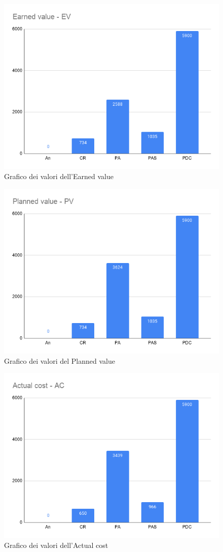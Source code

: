         \begin{figure}[H]
            \centering
            \includegraphics[width=11 cm]{source/sections/images/Earned_value.png}
            \caption{Grafico dei valori dell'Earned value}
        \end{figure}

        \begin{figure}[H]
            \centering
            \includegraphics[width=11 cm]{source/sections/images/planned_value.png}
            \caption{Grafico dei valori del Planned value}
        \end{figure}


        \begin{figure}[H]
            \centering
            \includegraphics[width=11 cm]{source/sections/images/actual_cost.png}
            \caption{Grafico dei valori dell'Actual cost}
        \end{figure}



